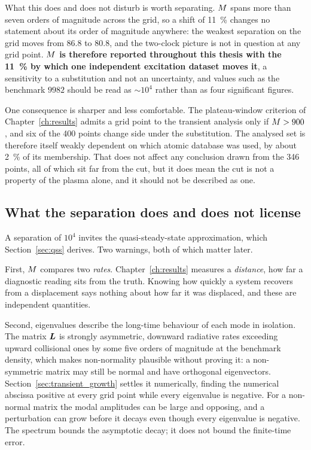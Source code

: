 What this does and does not disturb is worth separating. $M$ spans more
than seven orders of magnitude across the grid, so a shift of \SI{11}{\percent}
changes no statement about its order of magnitude anywhere: the weakest
separation on the grid moves from $86.8$ to $80.8$, and the two-clock picture is
not in question at any grid point. \textbf{$M$ is therefore reported
throughout this thesis with the \SI{11}{\percent} by which one independent
excitation dataset moves it}, a sensitivity to a substitution and not an
uncertainty, and
values such as the benchmark $9982$ should be read as $\sim\!10^{4}$ rather than
as four significant figures.

One consequence is sharper and less comfortable. The plateau-window criterion of
Chapter~\ref{ch:results} admits a grid point to the transient analysis only if
$M > 900$, and six of the 400 points change side under the substitution.
The analysed set is therefore itself weakly dependent on which atomic database
was used, by about \SI{2}{\percent} of its membership. That does not affect any
conclusion drawn from the 346 points, all of which sit far from the cut, but it
does mean the cut is not a property of the plasma alone, and it should not be
described as one.

\subsection{What the separation does and does not license}

A separation of $10^{4}$ invites the quasi-steady-state approximation, which
Section~\ref{sec:qss} derives. Two warnings, both of which matter later.

First, $M$ compares two \emph{rates}. Chapter~\ref{ch:results} measures a
\emph{distance}, how far a diagnostic reading sits from the truth. Knowing how
quickly a system recovers from a displacement says nothing about how far it
was displaced, and these are independent quantities.

Second, eigenvalues describe the long-time behaviour of each mode in isolation.
The matrix $\bm{L}$ is strongly asymmetric, downward radiative rates exceeding
upward collisional ones by some five orders of magnitude at the benchmark
density, which makes non-normality plausible without proving it: a
non-symmetric matrix may still be normal and have orthogonal eigenvectors.
Section~\ref{sec:transient_growth} settles it numerically, finding the
numerical abscissa positive at every grid point while every eigenvalue is
negative. For a non-normal matrix the modal amplitudes can be large and
opposing, and a perturbation can grow before it decays even though every
eigenvalue is negative. The spectrum bounds the asymptotic decay; it does not
bound the finite-time error.

